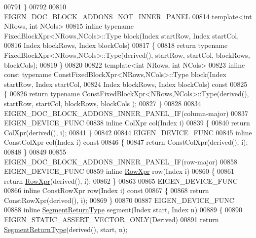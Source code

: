\begin{DoxyCode}
00791 \}
00792 
00810 EIGEN\_DOC\_BLOCK\_ADDONS\_NOT\_INNER\_PANEL
00814 \textcolor{keyword}{template}<\textcolor{keywordtype}{int} NRows, \textcolor{keywordtype}{int} NCols>
00815 \textcolor{keyword}{inline} \textcolor{keyword}{typename} FixedBlockXpr<NRows,NCols>::Type block(Index startRow, Index startCol,
00816                                                   Index blockRows, Index blockCols)
00817 \{
00818   \textcolor{keywordflow}{return} \textcolor{keyword}{typename} FixedBlockXpr<NRows,NCols>::Type(derived(), startRow, startCol, blockRows, blockCols);
00819 \}
00820 
00822 \textcolor{keyword}{template}<\textcolor{keywordtype}{int} NRows, \textcolor{keywordtype}{int} NCols>
00823 \textcolor{keyword}{inline} \textcolor{keyword}{const} \textcolor{keyword}{typename} ConstFixedBlockXpr<NRows,NCols>::Type block(Index startRow, Index startCol,
00824                                                               Index blockRows, Index blockCols)\textcolor{keyword}{ const}
00825 \textcolor{keyword}{}\{
00826   \textcolor{keywordflow}{return} \textcolor{keyword}{typename} ConstFixedBlockXpr<NRows,NCols>::Type(derived(), startRow, startCol, blockRows, blockCols
      );
00827 \}
00828 
00834 EIGEN\_DOC\_BLOCK\_ADDONS\_INNER\_PANEL\_IF(column-major)
00837 EIGEN\_DEVICE\_FUNC
00838 \textcolor{keyword}{inline} ColXpr col(Index i)
00839 \{
00840   \textcolor{keywordflow}{return} ColXpr(derived(), i);
00841 \}
00842 
00844 EIGEN\_DEVICE\_FUNC
00845 \textcolor{keyword}{inline} ConstColXpr col(Index i)\textcolor{keyword}{ const}
00846 \textcolor{keyword}{}\{
00847   \textcolor{keywordflow}{return} ConstColXpr(derived(), i);
00848 \}
00849 
00855 EIGEN\_DOC\_BLOCK\_ADDONS\_INNER\_PANEL\_IF(row-major)
00858 EIGEN\_DEVICE\_FUNC
00859 \textcolor{keyword}{inline} \hyperlink{group___core___module_class_eigen_1_1_block}{RowXpr} row(Index i)
00860 \{
00861   \textcolor{keywordflow}{return} \hyperlink{group___core___module_class_eigen_1_1_block}{RowXpr}(derived(), i);
00862 \}
00863 
00865 EIGEN\_DEVICE\_FUNC
00866 \textcolor{keyword}{inline} ConstRowXpr row(Index i)\textcolor{keyword}{ const}
00867 \textcolor{keyword}{}\{
00868   \textcolor{keywordflow}{return} ConstRowXpr(derived(), i);
00869 \}
00870 
00887 EIGEN\_DEVICE\_FUNC
00888 \textcolor{keyword}{inline} \hyperlink{group___core___module_class_eigen_1_1_vector_block}{SegmentReturnType} segment(Index start, Index n)
00889 \{
00890   EIGEN\_STATIC\_ASSERT\_VECTOR\_ONLY(Derived)
00891   \textcolor{keywordflow}{return} \hyperlink{group___core___module_class_eigen_1_1_vector_block}{SegmentReturnType}(derived(), start, n);

\end{DoxyCode}
